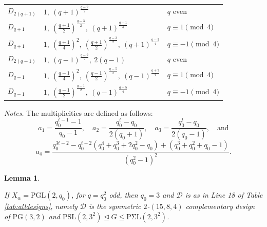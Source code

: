 \documentclass[a4paper,twopage,reqno,12pt]{amsart}
\newtheorem{lemma}[theorem]{Lemma}
\theoremstyle{definition}
\numberwithin{equation}{section}
\newcommand{\PSL}{\mathrm{PSL}}
\newcommand{\PSiL}{\mathrm{P \Sigma L}}
\newcommand{\PG}{\mathrm{PG}}
\renewcommand{\leq}{\leqslant}
\begin{document}
\begin{table}
\begin{threeparttable}
\begin{tabular}{
  >{\raggedright\arraybackslash}p{}
  >{\raggedright\arraybackslash}p{}
  >{\raggedright\arraybackslash}p{}
}
$D_{2(q+1)}$ & $1,\ (q+1)^{\frac{q-2}{2}}$ & $q$ even \\ 
\addlinespace[0.8ex] 
$D_{q+1}$    & $1,\ (\frac{q+1}{2})^{\frac{q-3}{2}},\ (q+1)^{\frac{q-1}{4}}$ & $q \equiv 1 \pmod{4}$ \\ 
\addlinespace[0.8ex] 
$D_{q+1}$    & $1,\ (\frac{q+1}{4})^{2},\ (\frac{q+1}{2})^{\frac{q-3}{2}},\ (q+1)^{\frac{q-3}{4}}$ & $q \equiv -1 \pmod{4}$ \\ 
\midrule

$D_{2(q-1)}$ & $1,\ (q-1)^{\frac{q-2}{2}},\ 2(q-1)$ & $q$ even \\ 
\addlinespace[0.8ex] 
$D_{q-1}$    & $1,\ (\frac{q-1}{4})^{2},\ (\frac{q-1}{2})^{\frac{q-5}{2}},\ (q-1)^{\frac{q+7}{4}} $ & $q \equiv 1 \pmod{4}$ \\ 
\addlinespace[0.8ex] 
$D_{q-1}$    & $1,\ (\frac{q-1}{2})^{\frac{q-1}{2}},\ (q-1)^{\frac{q+5}{4}}$ & $q \equiv -1 \pmod{4}$\\
\bottomrule
\end{tabular}

\begin{tablenotes}
  \small
  \item \textit{Notes.} The multiplicities are defined as follows:
  \\[1.2ex] 
  $$\displaystyle a_1 = \frac{q_0^{t-1}-1}{q_0-1}, \quad a_2 = \frac{q_0^t-q_0}{2(q_0+1)}, \quad a_3 = \frac{q_0^t-q_0}{2(q_0-1)}, \quad \text{and} $$
  $$\displaystyle a_4 = \frac{q_0^{3t-2} - q_0^{t-2}(q_0^4+q_0^3+2q_0^2-q_0) + (q_0^3+q_0^2+q_0-1)}{(q_0^2-1)^2}.$$
\end{tablenotes}
\end{threeparttable}
\end{table}


\begin{lemma}\label{case1}

If $X_{\alpha}= \mathrm{PGL}(2,q_0)$, for $q=q_0^2$ odd, then $q_0=3$ and $\mathcal{D}$ is as in Line 18 of Table \ref{tab:alldesigns}, namely $\mathcal{D}$ is the symmetric $2$-$(15,8,4)$ complementary design of $\PG(3,2)$ and $\PSL(2,3^{2})\unlhd G \leq \PSiL(2,3^{2})$. 
\end{lemma}
\end{document}
